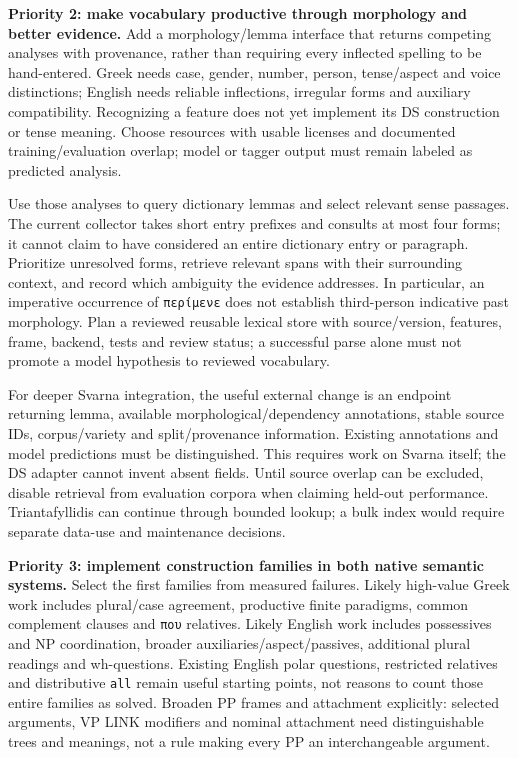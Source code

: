 \documentclass[11pt,a4paper]{article}
\begin{document}
\textbf{Priority 2: make vocabulary productive through morphology and
better evidence.} Add a morphology/lemma interface that returns
competing analyses with provenance, rather than requiring every
inflected spelling to be hand-entered. Greek needs case, gender, number,
person, tense/aspect and voice distinctions; English needs reliable
inflections, irregular forms and auxiliary compatibility. Recognizing a
feature does not yet implement its DS construction or tense meaning.
Choose resources with usable licenses and documented training/evaluation
overlap; model or tagger output must remain labeled as predicted
analysis.

Use those analyses to query dictionary lemmas and select relevant sense
passages. The current collector takes short entry prefixes and consults
at most four forms; it cannot claim to have considered an entire
dictionary entry or paragraph. Prioritize unresolved forms, retrieve
relevant spans with their surrounding context, and record which
ambiguity the evidence addresses. In particular, an imperative
occurrence of \texttt{περίμενε} does not establish third-person
indicative past morphology. Plan a reviewed reusable lexical store with
source/version, features, frame, backend, tests and review status; a
successful parse alone must not promote a model hypothesis to reviewed
vocabulary.

For deeper Svarna integration, the useful external change is an endpoint
returning lemma, available morphological/dependency annotations, stable
source IDs, corpus/variety and split/provenance information. Existing
annotations and model predictions must be distinguished. This requires
work on Svarna itself; the DS adapter cannot invent absent fields. Until
source overlap can be excluded, disable retrieval from evaluation
corpora when claiming held-out performance. Triantafyllidis can continue
through bounded lookup; a bulk index would require separate data-use and
maintenance decisions.

\textbf{Priority 3: implement construction families in both native
semantic systems.} Select the first families from measured failures.
Likely high-value Greek work includes plural/case agreement, productive
finite paradigms, common complement clauses and \texttt{που} relatives.
Likely English work includes possessives and NP coordination, broader
auxiliaries/aspect/passives, additional plural readings and
wh-questions. Existing English polar questions, restricted relatives and
distributive \texttt{all} remain useful starting points, not reasons to
count those entire families as solved. Broaden PP frames and attachment
explicitly: selected arguments, VP LINK modifiers and nominal attachment
need distinguishable trees and meanings, not a rule making every PP an
interchangeable argument.
\end{document}
